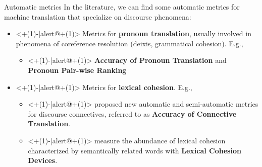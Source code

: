 \begin{frame}{Automatic metrics}
	In the literature, we can find some automatic metrics for machine translation that specialize on discourse phenomena:
	\begin{itemize}
		\item<+(1)-|alert@+(1)> Metrics for \textbf{pronoun translation}, usually involved in phenomena of coreference resolution (deixis, grammatical cohesion). E.g.,
			\begin{itemize}
				\item<+(1)-|alert@+(1)> \textbf{Accuracy of Pronoun Translation} \cite{miculicich_werlen_validation_2017} and \textbf{Pronoun Pair-wise Ranking} \cite{jwalapuram_evaluating_2019}
			\end{itemize}
		\item<+(1)-|alert@+(1)> Metrics for \textbf{lexical cohesion}. E.g.,
			\begin{itemize}
				\item<+(1)-|alert@+(1)> \cite{hajlaoui_assessing_2013} proposed new automatic and semi-automatic metrics for discourse connectives, referred to as \textbf{Accuracy of Connective Translation}.
				\item<+(1)-|alert@+(1)> \cite{wong_extending_2012} measure the abundance of lexical cohesion characterized by semantically related words with \textbf{Lexical Cohesion Devices}.
			\end{itemize}
	\end{itemize}
	
\end{frame}


